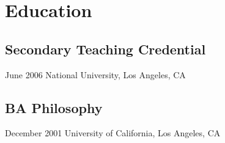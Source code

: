 

\section{Education}
\subsection{Secondary Teaching Credential}{}{June 2006}
National University, Los Angeles, CA \hfill 

\subsection{BA Philosophy}{}{December 2001}
University of California, Los Angeles, CA \hfill 

\vspace{0.2em}